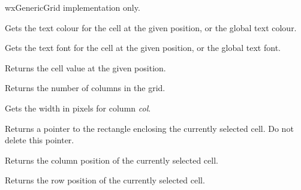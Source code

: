 wxGenericGrid implementation only.




Gets the text colour for the cell at the given position, or the global text colour.




Gets the text font for the cell at the given position, or the global text font.



Returns the cell value at the given position.



Returns the number of columns in the grid.



Gets the width in pixels for column {\it col}.



Returns a pointer to the rectangle enclosing the currently selected cell.
Do not delete this pointer.



Returns the column position of the currently selected cell.



Returns the row position of the currently selected cell.



